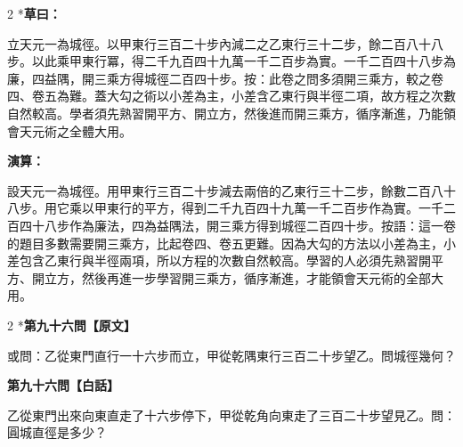 \documentclass[11pt,a4paper]{article}
\begin{document}
\vspace{0.1cm}
\noindent{}
\par\vspace{0.15cm}

\begin{paracol}{2}
\switchcolumn[0]*\textbf{草曰：}

\small 立天元一為城徑。以甲東行三百二十步內減二之乙東行三十二步，餘二百八十八步。以此乘甲東行冪，得二千九百四十九萬一千二百步為實。一千二百四十八步為廉，四益隅，開三乘方得城徑二百四十步。按：此卷之問多須開三乘方，較之卷四、卷五為難。蓋大勾之術以小差為主，小差含乙東行與半徑二項，故方程之次數自然較高。學者須先熟習開平方、開立方，然後進而開三乘方，循序漸進，乃能領會天元術之全體大用。

\switchcolumn\textbf{演算：}

\small 設天元一為城徑。用甲東行三百二十步減去兩倍的乙東行三十二步，餘數二百八十八步。用它乘以甲東行的平方，得到二千九百四十九萬一千二百步作為實。一千二百四十八步作為廉法，四為益隅法，開三乘方得到城徑二百四十步。按語：這一卷的題目多數需要開三乘方，比起卷四、卷五更難。因為大勾的方法以小差為主，小差包含乙東行與半徑兩項，所以方程的次數自然較高。學習的人必須先熟習開平方、開立方，然後再進一步學習開三乘方，循序漸進，才能領會天元術的全部大用。
\end{paracol}

\vspace{0.1cm}
\noindent{}
\par\vspace{0.3cm}

\begin{paracol}{2}
\switchcolumn[0]*\noindent\textbf{第九十六問【原文】}

\small 或問：乙從東門直行一十六步而立，甲從乾隅東行三百二十步望乙。問城徑幾何？

\switchcolumn\noindent\textbf{第九十六問【白話】}

\small 乙從東門出來向東直走了十六步停下，甲從乾角向東走了三百二十步望見乙。問：圓城直徑是多少？
\end{paracol}
\end{document}
